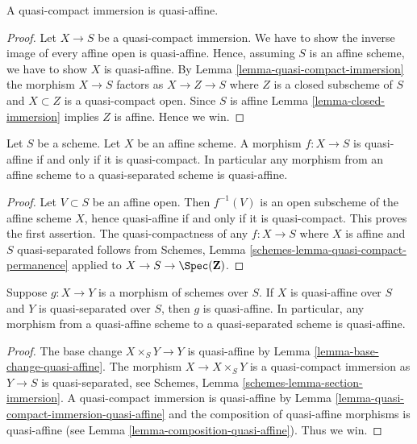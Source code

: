 \begin{lemma}
\label{lemma-quasi-compact-immersion-quasi-affine}
A quasi-compact immersion is quasi-affine.
\end{lemma}

\begin{proof}
Let $X \to S$ be a quasi-compact immersion. We have to show the
inverse image of every affine open is quasi-affine. Hence,
assuming $S$ is an affine scheme, we have to show
$X$ is quasi-affine. By Lemma \ref{lemma-quasi-compact-immersion}
the morphism $X \to S$ factors as $X \to Z \to S$ where $Z$ is a closed
subscheme of $S$ and $X \subset Z$ is a quasi-compact open.
Since $S$ is affine Lemma \ref{lemma-closed-immersion} implies
$Z$ is affine. Hence we win.
\end{proof}

\begin{lemma}
\label{lemma-affine-quasi-affine}
Let $S$ be a scheme. Let $X$ be an affine scheme.
A morphism $f : X \to S$ is quasi-affine if and only if it is quasi-compact.
In particular any morphism from an affine scheme to a quasi-separated
scheme is quasi-affine.
\end{lemma}

\begin{proof}
Let $V \subset S$ be an affine open. Then $f^{-1}(V)$ is an open subscheme
of the affine scheme $X$, hence quasi-affine if and only if it is
quasi-compact. This proves the first assertion. The quasi-compactness of any
$f : X \to S$ where $X$ is affine and $S$ quasi-separated follows from
Schemes, Lemma \ref{schemes-lemma-quasi-compact-permanence}
applied to $X \to S \to \Spec(\mathbf{Z})$.
\end{proof}

\begin{lemma}
\label{lemma-quasi-affine-permanence}
Suppose $g : X \to Y$ is a morphism of schemes over $S$.
If $X$ is quasi-affine over $S$ and $Y$ is quasi-separated over $S$,
then $g$ is quasi-affine. In particular, any morphism from a
quasi-affine scheme to a quasi-separated scheme is quasi-affine.
\end{lemma}

\begin{proof}
The base change $X \times_S Y \to Y$ is quasi-affine by
Lemma \ref{lemma-base-change-quasi-affine}.
The morphism $X \to X \times_S Y$ is
a quasi-compact immersion as $Y \to S$ is quasi-separated, see
Schemes, Lemma \ref{schemes-lemma-section-immersion}.
A quasi-compact immersion is quasi-affine by
Lemma \ref{lemma-quasi-compact-immersion-quasi-affine}
and the composition of quasi-affine morphisms is quasi-affine
(see Lemma \ref{lemma-composition-quasi-affine}). Thus we win.
\end{proof}











